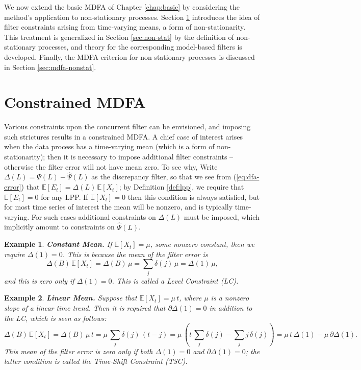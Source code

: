 \documentclass[a4paper]{book}
\def\EE{\mathbb E}
\newtheorem{Example}{Example}
\begin{document}
 We now extend the basic MDFA of Chapter \ref{chap:basic}  by considering
 the method's application to  non-stationary processes.  
 Section \ref{sec:constraint} introduces the idea of filter constraints
arising from time-varying means, a form of non-stationarity.
 This treatment is generalized in Section \ref{sec:non-stat}
  by the definition of non-stationary processes, and theory for the corresponding
   model-based filters is developed.  Finally, the MDFA criterion for
    non-stationary processes is discussed in Section \ref{sec:mdfa-nonstat}.
 

\section{Constrained MDFA}
\label{sec:constraint}

 Various constraints upon the concurrent filter can be envisioned, 
   and imposing such strictures results in  a constrained MDFA. 
   A chief case of interest arises when the 
    data process has a time-varying mean (which is a form of  non-stationarity);
  then it is necessary to impose additional filter constraints -- otherwise
   the filter error will not have mean zero.    To see why, 
   Write $\Delta (L) = \Psi (L) - \widehat{\Psi} (L)$ as the discrepancy filter,
   so that we see  from (\ref{eq:dfa-error})  
   that $\EE [ E_t ] = \Delta (L) \, \EE [ X_t ]$; 
   by Definition \ref{def:lpp}, we require
 that $\EE [ E_t ] = 0$ for any LPP.  
  If $\EE [ X_t] = 0$ then this condition is always satisfied, but
   for most time series of interest the mean will be nonzero, and is typically
    time-varying.  For such cases additional constraints on $\Delta (L)$ must be imposed,
    which implicitly amount to constraints on $\widehat{\Psi} (L)$.
    
\begin{Example}    {\bf Constant Mean.}  \rm
\label{exam:constant.mean}
  If $\EE [ X_t ] = \mu$, some nonzero constant,  then we require $\Delta (1) = 0$.
  This is because the mean of the filter error is
  \[
   \Delta (B) \, \EE [ X_t] = \Delta(B) \, \mu = \sum_j \delta (j) \, \mu =
   \Delta (1) \, \mu,
  \]
  and this is zero only if $\Delta (1) = 0$.  This is called a Level Constraint (LC).
\end{Example}  

\begin{Example}    {\bf Linear Mean.}  \rm
\label{exam:linear.mean}
  Suppose that $\EE [ X_t ] = \mu \, t$, where $\mu$ is a nonzero slope
 of a linear time trend.  Then it is required that  $\partial {\Delta} (1) = 0$
  in addition to the LC,  which is seen as follows:
  \[
   \Delta (B) \, \EE [ X_t] = \Delta(B) \, \mu \, t =   \mu \, \sum_j \delta (j) \, (t-j)
   = \mu \, \left(t \, \sum_j \delta (j) - \sum_j j \,\delta (j) \right)
    = \mu \, t \, \Delta(1) - \mu \, \partial \Delta (1).
  \]
  This mean of the filter error  is zero only if both $\Delta(1)=0$ and
  $\partial \Delta (1)=0$; the latter condition is called the
   Time-Shift Constraint (TSC).  
\end{Example}  
\end{document}
